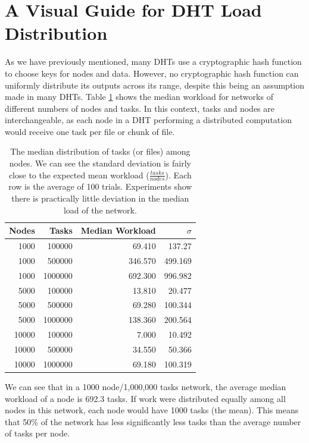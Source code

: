 \documentclass[10pt,conference]{IEEEtran}
\begin{document}
\section{A Visual Guide for DHT Load Distribution }

As we have previously mentioned, many DHTs use a cryptographic hash function to choose keys for nodes and data.
However, no cryptographic hash function can uniformly distribute its outputs across its range, despite this being an assumption made in many DHTs. 
Table \ref{tab:medianLoads} shows the median workload for networks of different numbers of nodes and tasks.
In this context, tasks and nodes are interchangeable, as each node in a DHT performing a distributed computation would receive one task per file or chunk of file.


\begin{table}
	\centering
	\caption{The median distribution of tasks (or files) among nodes.  We can see the standard deviation is fairly close to the expected mean workload ($\frac{tasks}{nodes}$). Each row is the average of 100 trials.  Experiments show there is practically little deviation in the median load of the network.}
	\begin{tabular}{r r r r}
		Nodes & Tasks & Median Workload & $\sigma$ \\ \hline
		1000 & 100000 & 69.410   &  137.27  \\
		1000 & 500000 & 346.570  &  499.169 \\
		1000 & 1000000 & 692.300  &  996.982 \\
		
		5000 & 100000  & 13.810 & 20.477 \\ 
		5000 & 500000  & 69.280 & 100.344 \\ 
		5000 & 1000000 &138.360 & 200.564 \\ 
		
		10000 & 100000 & 7.000   &  10.492 \\
		10000 & 500000 & 34.550  &   50.366 \\
		10000 & 1000000& 69.180  &  100.319 \\
	\end{tabular}
	\label{tab:medianLoads}
\end{table}



We can see  that in a 1000 node/1,000,000 tasks network, the average median workload of a node is 692.3 tasks. 
If work were distributed equally among all nodes in this network, each node would have 1000 tasks (the mean).
This means that 50\% of the network has less significantly less tasks than the average number of tasks per node.
\end{document}
